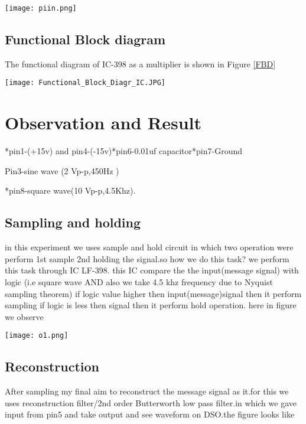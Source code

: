 \documentclass{article}
\begin{document}
\begin{figure*}[ht]
	\centering
	\texttt{[image: piin.png]}
	\caption{Function of different pin}
	\label{piin}
\end{figure*}

\subsection{Functional Block diagram}
The functional diagram of IC-398 as a multiplier is shown in Figure \ref{FBD}
\begin{figure*}[h]
	\centering
	\texttt{[image: Functional\_Block\_Diagr\_IC.JPG]}
	\caption{Functional Block Diagram of IC-398}
	\label{FBD}
\end{figure*}



\section{Observation and Result}
*pin1-(+15v) and pin4-(-15v)*pin6-0.01uf capacitor*pin7-Ground \par *Pin3-sine wave (2 Vp-p,450Hz )\par
*pin8-square wave(10 Vp-p,4.5Khz).\par
\subsection{Sampling and holding}
in this experiment we uses sample and hold circuit in which two operation were perform 1st sample 2nd holding the signal.so how we do this task? we perform this task through IC LF-398. this IC compare the  the input(message signal) with logic (i.e square wave AND also we take 4.5 khz frequency due to Nyquist sampling theorem) if logic value higher then input(message)signal then it perform sampling if logic is less then signal then it perform hold operation.
here in figure we observe \par


\begin{figure*}[h]
	\centering
	\texttt{[image: o1.png]}
	\caption{Sampling and holding task perform }
	\label{o1}
\end{figure*}
\subsection{Reconstruction}
After sampling my final aim to reconstruct the message signal as it.for this we uses reconstruction filter/2nd order Butterworth low pass filter.in which we gave input from pin5 and take output and see waveform on DSO.the figure looks like 
\end{document}

